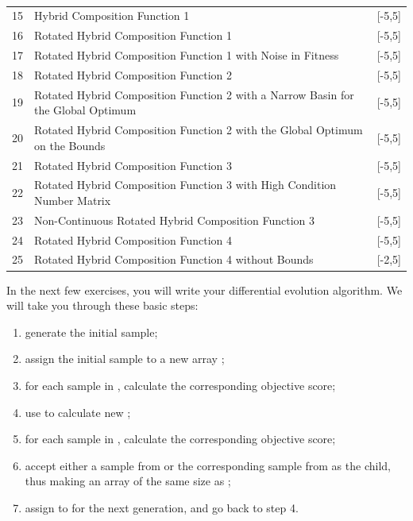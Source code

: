 \begin{table}[t]
\begin{tabular}{lp{9cm}l}
15  &Hybrid Composition Function 1                                       & [-5,5]\\
16  &Rotated Hybrid Composition Function 1                               & [-5,5]\\
17  &Rotated Hybrid Composition Function 1 with Noise in Fitness                     & [-5,5]\\
18  &Rotated Hybrid Composition Function 2                               & [-5,5]\\
19  &Rotated Hybrid Composition Function 2 with a Narrow Basin for the Global Optimum    & [-5,5]\\
20  &Rotated Hybrid Composition Function 2 with the Global Optimum on the Bounds         & [-5,5]\\
21  &Rotated Hybrid Composition Function 3                           & [-5,5]\\
22  &Rotated Hybrid Composition Function 3 with High Condition Number Matrix         & [-5,5]\\
23  &Non-Continuous Rotated Hybrid Composition Function 3                        & [-5,5]\\
24  &Rotated Hybrid Composition Function 4                               & [-5,5]\\
25  &Rotated Hybrid Composition Function 4 without Bounds                            & [-2,5]\\
\end{tabular}
\caption{}
\label{tab:benchmark-func-data}
\end{table}




In the next few exercises, you will write your differential evolution algorithm. We will take you through these basic steps:
\begin{enumerate}
\item{generate the initial sample;}
\item{assign the initial sample to a new array ;}
\item{for each sample in , calculate the corresponding objective score;}
\item{use  to calculate new ;}
\item{for each sample in , calculate the corresponding objective score;}
\item{accept either a sample from  or the corresponding sample from  as the child, thus making an array  of the same size as ;}
\item{assign  to  for the next generation, and go back to step 4.}
\end{enumerate}

